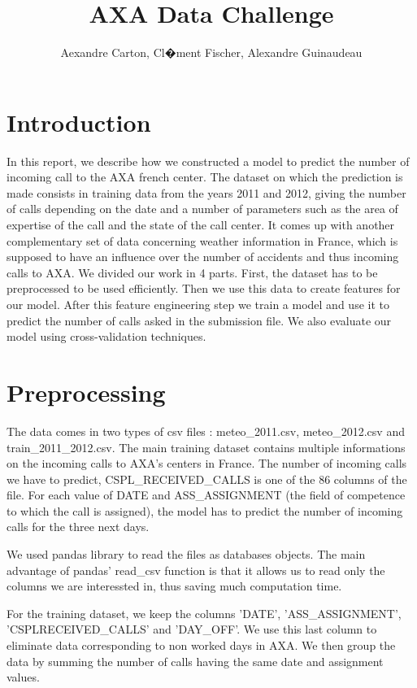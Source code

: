 \documentclass[english]{article}
\begin{document}
\title{AXA Data Challenge}


\author{Aexandre Carton, Cl�ment Fischer, Alexandre Guinaudeau}

\maketitle

\section{Introduction}

In this report, we describe how we constructed a model to predict
the number of incoming call to the AXA french center. The dataset
on which the prediction is made consists in training data from the
years 2011 and 2012, giving the number of calls depending on the date
and a number of parameters such as the area of expertise of the call
and the state of the call center. It comes up with another complementary
set of data concerning weather information in France, which is supposed
to have an influence over the number of accidents and thus incoming
calls to AXA. We divided our work in 4 parts. First, the dataset has
to be preprocessed to be used efficiently. Then we use this data to
create features for our model. After this feature engineering step
we train a model and use it to predict the number of calls asked in
the submission file. We also evaluate our model using cross-validation
techniques.


\section{Preprocessing}

The data comes in two types of csv files : meteo\_2011.csv, meteo\_2012.csv
and train\_2011\_2012.csv. The main training dataset contains multiple
informations on the incoming calls to AXA's centers in France. The
number of incoming calls we have to predict, CSPL\_RECEIVED\_CALLS
is one of the 86 columns of the file. For each value of DATE and ASS\_ASSIGNMENT
(the field of competence to which the call is assigned), the model
has to predict the number of incoming calls for the three next days.

We used pandas library to read the files as databases objects. The
main advantage of pandas' read\_csv function is that it allows us
to read only the columns we are interessted in, thus saving much computation
time. 

For the training dataset, we keep the columns 'DATE', 'ASS\_ASSIGNMENT',
'CSPLRECEIVED\_CALLS' and 'DAY\_OFF'. We use this last column to eliminate
data corresponding to non worked days in AXA. We then group the data
by summing the number of calls having the same date and assignment
values. 
\end{document}
